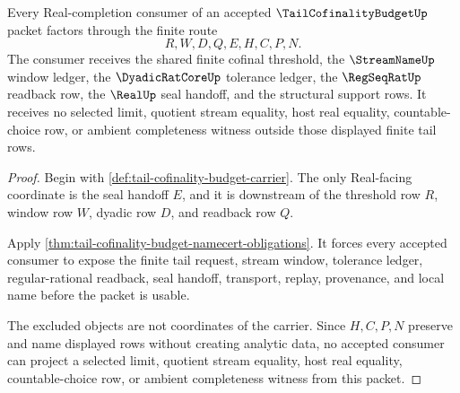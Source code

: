 \begin{theorem}
\label{thm:tail-cofinality-budget-nonescape}
Every Real-completion consumer of an accepted $\TailCofinalityBudgetUp$ packet factors through the finite route
$$
R,W,D,Q,E,H,C,P,N.
$$
The consumer receives the shared finite cofinal threshold, the $\StreamNameUp$ window ledger, the $\DyadicRatCoreUp$ tolerance ledger, the $\RegSeqRatUp$ readback row, the $\RealUp$ seal handoff, and the structural support rows. It receives no selected limit, quotient stream equality, host real equality, countable-choice row, or ambient completeness witness outside those displayed finite tail rows.
\end{theorem}
\begin{proof}
Begin with \autoref{def:tail-cofinality-budget-carrier}. The only Real-facing coordinate is the seal handoff $E$, and it is downstream of the threshold row $R$, window row $W$, dyadic row $D$, and readback row $Q$.

Apply \autoref{thm:tail-cofinality-budget-namecert-obligations}. It forces every accepted consumer to expose the finite tail request, stream window, tolerance ledger, regular-rational readback, seal handoff, transport, replay, provenance, and local name before the packet is usable.

The excluded objects are not coordinates of the carrier. Since $H,C,P,N$ preserve and name displayed rows without creating analytic data, no accepted consumer can project a selected limit, quotient stream equality, host real equality, countable-choice row, or ambient completeness witness from this packet.
\end{proof}


